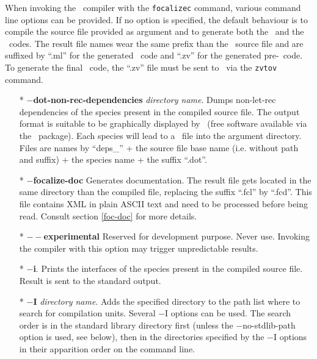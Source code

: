 

\label{compiler-options}
When invoking the \focal\ compiler with the {\tt focalizec} command,
various command line options can be provided. If no option is
specified, the default behaviour is to compile the source file
provided as argument and to generate both the \ocaml\ and the
\coq\ codes. The result file names wear the same prefix than the
\focal\ source file and are suffixed by ``.ml'' for the generated
\ocaml\ code and ``.zv'' for the generated pre-\coq\ code.
To generate the final \coq\ code, the ``.zv'' file must be sent to
\zenon\ via the {\tt zvtov} command.

\begin{itemize}
  \item[*] {\bf $-$dot-non-rec-dependencies} {\em directory name}.
    Dumps non-let-rec dependencies of the species present in the
    compiled source file. The output format is suitable to be
    graphically displayed by \dotty\ (free software available via the
    \graphviz\ package). Each species will lead to a \dotty\ file into
    the argument directory. Files are names by ``deps\_'' + the source
    file base name (i.e. without path and suffix) + the species name +
    the suffix ``.dot''.

  \item[*] {\bf $-$focalize-doc} Generates documentation. The
    result file gets located in the same directory than the compiled
    file, replacing the suffix ``.fcl'' by ``.fcd''. This file contains
    XML in plain ASCII text and need to be processed before being read.
    Consult section \ref{foc-doc} for more details.

  \item[*] {\bf $--$experimental} Reserved for development purpose.
    Never use. Invoking the compiler with this option may trigger
    unpredictable results.

  \item[*] {\bf $-$i}. Prints the interfaces of the species present in
    the compiled source file. Result is sent to the standard output.

  \item[*] {\bf $-$I} {\em directory name}. Adds the specified
    directory to the path list where to search for 
    compilation units. Several $-$I options can be used. The search order is
    in the standard library directory first (unless the
    $-$no-stdlib-path option is used, see below), then in the
    directories specified by the $-$I options in their apparition
    order on the command line.


\end{itemize}
